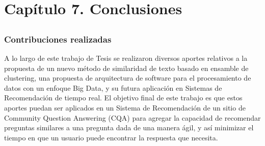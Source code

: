 \chapter*{Capítulo 7. \textbf{Conclusiones}}\label{ch:conclusiones}

\section*{}
\addtocounter{section}{1}
\setcounter{subsection}{0}

\subsection{Contribuciones realizadas}
A lo largo de este trabajo de Tesis se realizaron diversos aportes relativos a la propuesta de un nuevo método de similaridad de texto basado en ensamble de clustering, una propuesta de arquitectura de software para el procesamiento de datos con un enfoque Big Data, y su futura aplicación en Sistemas de Recomendación de tiempo real. El objetivo final de este trabajo es que estos aportes puedan ser aplicados en un Sistema de Recomendación de un sitio de Community Question Answering (CQA) para agregar la capacidad de recomendar preguntas similares a una pregunta dada de una manera ágil, y así minimizar el tiempo en que un usuario puede encontrar la respuesta que necesita.

